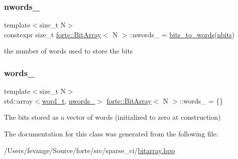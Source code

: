 \subsubsection{\texorpdfstring{nwords\+\_\+}{nwords\_}}
{\footnotesize\ttfamily template$<$size\+\_\+t N$>$ \\
constexpr size\+\_\+t \mbox{\hyperlink{classforte_1_1_bit_array}{forte\+::\+Bit\+Array}}$<$ N $>$\+::nwords\+\_\+ = \mbox{\hyperlink{classforte_1_1_bit_array_a95b9ef6120acba58b0131afb94538411}{bits\+\_\+to\+\_\+words}}(\mbox{\hyperlink{classforte_1_1_bit_array_a13866977deadcb098f2e5053025d12f0}{nbits}})\hspace{0.3cm}{\ttfamily [static]}}



the number of words used to store the bits 

\mbox{\label{classforte_1_1_bit_array_a3c8589dce264f70e98857d6e9eed1245}} 
\subsubsection{\texorpdfstring{words\+\_\+}{words\_}}
{\footnotesize\ttfamily template$<$size\+\_\+t N$>$ \\
std\+::array$<$\mbox{\hyperlink{classforte_1_1_bit_array_a7f3b4ebbbe4bc80ce60cc6614cb565da}{word\+\_\+t}}, \mbox{\hyperlink{classforte_1_1_bit_array_aeaa8016f00f9ffc5822081f7e45656e8}{nwords\+\_\+}}$>$ \mbox{\hyperlink{classforte_1_1_bit_array}{forte\+::\+Bit\+Array}}$<$ N $>$\+::words\+\_\+ = \{\}\hspace{0.3cm}{\ttfamily [protected]}}



The bits stored as a vector of words (initialized to zero at construction) 



The documentation for this class was generated from the following file\+:\begin{DoxyCompactItemize}
\item 
/\+Users/fevange/\+Source/forte/src/sparse\+\_\+ci/\mbox{\hyperlink{bitarray_8hpp}{bitarray.\+hpp}}\end{DoxyCompactItemize}
